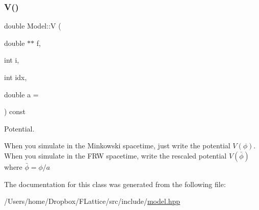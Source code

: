 \subsubsection{\texorpdfstring{V()}{V()}}
{\footnotesize\ttfamily double Model\+::V (\begin{DoxyParamCaption}\item[{double $\ast$$\ast$}]{f,  }\item[{int}]{i,  }\item[{int}]{idx,  }\item[{double}]{a = {} }\end{DoxyParamCaption}) const\hspace{0.3cm}{\ttfamily [inline]}}



Potential. 

When you simulate in the Minkowski spacetime, just write the potential $ V(\phi) $. When you simulate in the F\+RW spacetime, write the rescaled potential $ V(\bar{\phi}) $ where $ \bar{\phi} = \phi / a $ 

The documentation for this class was generated from the following file\+:\begin{DoxyCompactItemize}
\item 
/\+Users/home/\+Dropbox/\+F\+Lattice/src/include/\mbox{\hyperlink{model_8hpp}{model.\+hpp}}\end{DoxyCompactItemize}
